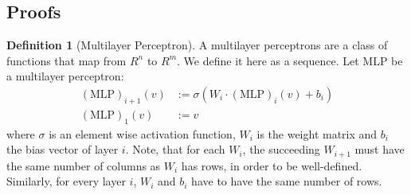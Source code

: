 \documentclass[11pt, dvipsnames, DIV=12]{scrreprt}
\theoremstyle{definition}
\newtheorem{definition}[theorem]{Definition}
\newcommand{\mlp}{\text{MLP}}
\begin{document}
\subsection*{Proofs}

\begin{definition}[Multilayer Perceptron]\label{def:mlp}
    A multilayer perceptrons are a class of functions that map from $R^n$ to $R^m$. We define it here as a sequence. Let MLP be a multilayer perceptron:
    \begin{align*}
        (\mlp)_{i+1}(v) &:= \sigma(W_i \cdot (\mlp)_{i} (v) + b_i)\\
        (\mlp)_{1}(v) &:= v
    \end{align*}
    where $\sigma$ is an element wise activation function, $W_i$ is the weight matrix and $b_i$ the bias vector of layer $i$. Note, that for each $W_i$, the succeeding $W_{i+1}$ must have the same number of columns as $W_i$ has rows, in order to be well-defined. Similarly, for every layer $i$, $W_i$ and $b_i$ have to have the same number of rows.
\end{definition}
\end{document}
